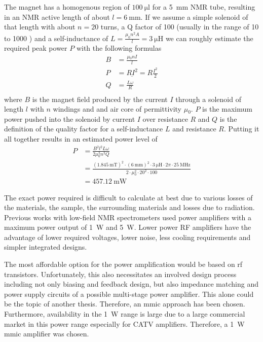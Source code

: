 The magnet has a homogenous region of \(\qty{100}{\micro\litre}\) for a \qty{5}{\milli\meter} NMR tube, resulting in an NMR active length of about \(l = \qty{6}{\milli\meter}\). If we assume a simple solenoid of that length with about \(n = 20\) turns, a Q factor of 100 (usually in the range of 10 to 1000 ) and a self-inductance of \(L = \frac{\mu_0n^2A}{l} = \qty{3}{\micro\henry}\)\sidenote{} we can roughly estimate the required peak power \(P\) with the following formulas \cite{mispelterNMRProbeheadsBiophysical2015}
\begin{align}
    B & = \frac{\mu{}_0nI}{l}              \\
    P & = R\underbar{I}^2 = R\frac{I^2}{2} \\
    Q & = \frac{L\omega}{R}                \\
\end{align}
where \(B\) is the magnet field produced by the current \(I\) through a solenoid of length \(l\) with \(n\) windings and and air core of permittivity \(\mu{}_0\). \(P\) is the maximum power pushed into the solenoid by current \(I\) over resistance \(R\) and \(Q\) is the definition of the quality factor for a self-inductance \(L\) and resistance \(R\). Putting it all together results in an estimated power level of
\begin{align}
    P & = \frac{B^2l^2L\omega}{2\mu{}_0^2n^2Q}                                                                                                                                              \\
      & = \frac{(\qty{1.845}{\milli\tesla})^2 \cdot (\qty{6}{\milli\metre})^2 \cdot \qty{3}{\micro\henry} \cdot 2\pi{} \cdot \qty{25}{\mega\hertz}}{2 \cdot \mu{}_0^2 \cdot 20^2 \cdot 100} \\
      & = \qty{457.12}{\milli\watt}
\end{align}

The exact power required is difficult to calculate at best due to various losses of the materials, the sample, the surrounding materials and losses due to radiation. Previous works with low-field NMR spectrometers used power amplifiers with a maximum power output of \qty{1}{\watt}\cite{chenUltralowCostNMR2015} and \qty{5}{W}\cite{louis-josephDesigningBuildingLowcost2019}. Lower power RF amplifiers have the advantage of lower required voltages, lower noise, less cooling requirements and simpler integrated designs.

The most affordable option for the power amplification would be based on \acrshort{rf} transistors. Unfortunately, this also necessitates an involved design process including not only biasing and feedback design, but also impedance matching and power supply circuits of a possible multi-stage power amplifier. This alone could be the topic of another thesis. Therefore, an \acrshort{mmic} approach has been chosen. Furthermore, availability in the \qty{1}{\watt} range is large due to a large commercial market in this power range especially for CATV amplifiers. Therefore, a \qty{1}{\watt} \acrshort{mmic} amplifier was chosen.

